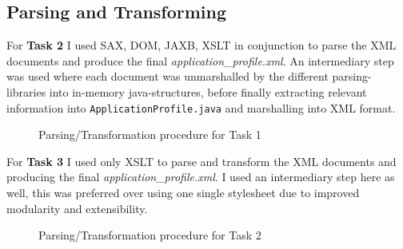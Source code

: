 \documentclass[a4paper, 11pt]{article}
\begin{document}
\subsection*{Parsing and Transforming}
For \textbf{Task 2} I used SAX, DOM, JAXB, XSLT in conjunction to parse the XML documents and produce the final \textit{application\_profile.xml}. An intermediary step was used where each document was unmarshalled by the different parsing-libraries into in-memory java-structures, before finally extracting relevant information into \texttt{ApplicationProfile.java} and marshalling into XML format.
\begin{figure}[H]
  \begin{center}
    \caption{Parsing/Transformation procedure for Task 1}
    \label{fig:fig1}
  \end{center}
\end{figure}
For \textbf{Task 3} I used only XSLT to parse and transform the XML documents and producing the final \textit{application\_profile.xml}. I used an intermediary step here as well, this was preferred over using one single stylesheet due to improved modularity and extensibility.
\begin{figure}[H]
  \begin{center}
    \caption{Parsing/Transformation  procedure for Task 2}
    \label{fig:fig2}
  \end{center}
\end{figure}
\end{document}
